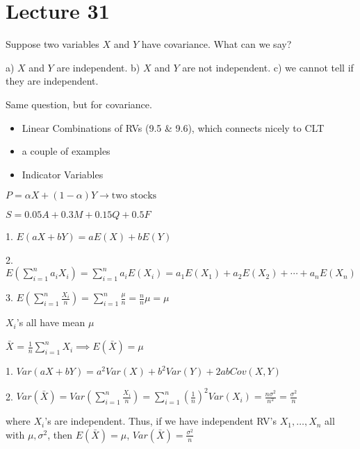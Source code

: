\section{Lecture 31}

Suppose two variables $ X $ and $ Y $ have  covariance.
What can we say?

a) $ X $ and $ Y $ are independent. b) $ X $ and $ Y $ are not independent.
c) we cannot tell if they are independent.

Same question, but for  covariance.

\begin{itemize}
    \item Linear Combinations of RVs (9.5 \& 9.6), which connects nicely to CLT
    \item a couple of examples
\end{itemize}

\begin{itemize}
    \item Indicator Variables
\end{itemize}


$ P=\alpha X+(1-\alpha)Y\rightarrow\text{two stocks} $

$ S=0.05A+0.3M+0.15Q+0.5F $


1. $ E(aX+bY)=aE(X)+bE(Y) $

2. $ E\left(\sum\limits_{i=1}^{n} a_iX_i\right)=\sum\limits_{i=1}^{n}a_i E(X_i)=
a_1E(X_1)+a_2E(X_2)+\cdots +a_nE(X_n) $

3. $ E\left(\sum\limits_{i=1}^{n} \frac{X_i}{n}\right)=\sum\limits_{i=1}^{n}\frac{\mu}{n}=\frac{n}{n} \mu=\mu $

$ X_i $'s all have mean $ \mu $

$ \bar{X} $ = $ \frac{1}{n} \sum\limits_{i=1}^{n} X_i\implies E(\bar{X})=\mu $


1. $ Var(aX+bY)=a^2Var(X)+b^2Var(Y)+2abCov(X,Y) $

2. $ Var(\bar{X})=Var\left(\sum\limits_{i=1}^{n} \frac{X_i}{n}\right)=\sum\limits_{i=1}^{n}\left( \frac{1}{n}  \right)^2
Var(X_i)=\frac{n\sigma^2}{n^2}=\frac{\sigma^2}{n} $

where $ X_i $'s are independent. Thus, if we have independent RV's
$ X_1,\ldots,X_n $ all with $ \mu,\sigma^2 $, then $ E(\bar{X})=\mu $,
$ Var(\bar{X})=\frac{\sigma^2}{n} $

